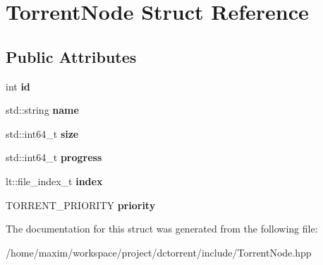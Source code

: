 \hypertarget{struct_torrent_node}{}\section{Torrent\+Node Struct Reference}
\label{struct_torrent_node}
\subsection*{Public Attributes}
\begin{DoxyCompactItemize}
\item 
\mbox{\label{struct_torrent_node_ab597f6244ad00fb272b888193ae42778}} 
int {\bfseries id}
\item 
\mbox{\label{struct_torrent_node_ab2e391a056ba40ac6f7d3912018a38fd}} 
std\+::string {\bfseries name}
\item 
\mbox{\label{struct_torrent_node_a5bdc2c7db542ae99d2138c11c5b0a366}} 
std\+::int64\+\_\+t {\bfseries size}
\item 
\mbox{\label{struct_torrent_node_a28b3ccc9020bccb339a258cb261fcfbe}} 
std\+::int64\+\_\+t {\bfseries progress}
\item 
\mbox{\label{struct_torrent_node_acf0a7ca9173fe84bb9ccd6b50340fd18}} 
lt\+::file\+\_\+index\+\_\+t {\bfseries index}
\item 
\mbox{\label{struct_torrent_node_a20339f0e65138efb21c95b41a0717be7}} 
T\+O\+R\+R\+E\+N\+T\+\_\+\+P\+R\+I\+O\+R\+I\+TY {\bfseries priority}
\end{DoxyCompactItemize}


The documentation for this struct was generated from the following file\+:\begin{DoxyCompactItemize}
\item 
/home/maxim/workspace/project/dctorrent/include/Torrent\+Node.\+hpp\end{DoxyCompactItemize}
